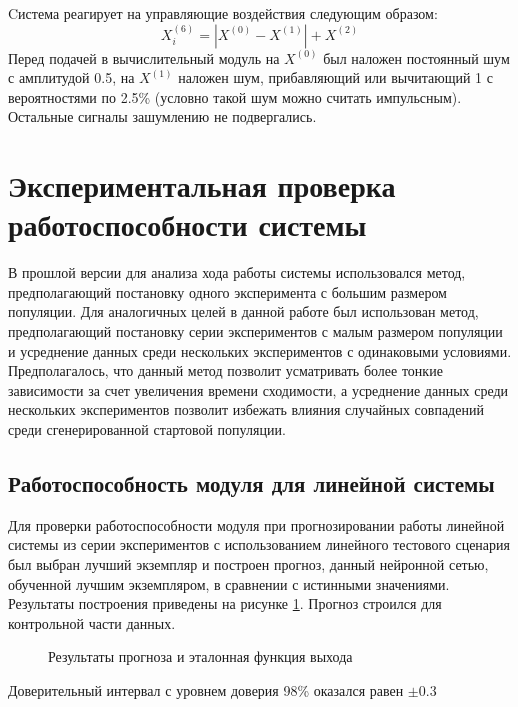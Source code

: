 \documentclass[utf8,usehyperref,14pt]{G7-32}
\begin{document}
Cистема реагирует на управляющие воздействия следующим образом:\\
\begin{equation}
X^{(6)}_{i} = |X^{(0)} - X^{(1)}| + X^{(2)}
\end{equation}
Перед подачей в вычислительный модуль на $ X^{(0)} $ был наложен постоянный шум с амплитудой 0.5, на $ X^{(1)} $ наложен шум, прибавляющий или вычитающий 1 с вероятностями по 2.5\% (условно такой шум можно считать импульсным). Остальные сигналы зашумлению не подвергались.

\section{Экспериментальная проверка работоспособности системы}
В прошлой версии для анализа хода работы системы использовался метод, предполагающий постановку одного эксперимента с большим размером популяции. Для аналогичных целей в данной работе был использован метод, предполагающий постановку серии экспериментов с малым размером популяции и усреднение данных среди нескольких экспериментов с одинаковыми условиями. Предполагалось, что данный метод позволит усматривать более тонкие зависимости за счет увеличения времени сходимости, а усреднение данных среди нескольких экспериментов позволит избежать влияния случайных совпадений среди сгенерированной стартовой популяции. \cite{SelfSystems}
\subsection{Работоспособность модуля для линейной системы}
Для проверки работоспособности модуля при прогнозировании работы линейной системы из серии экспериментов с использованием линейного тестового сценария был выбран лучший экземпляр и построен прогноз, данный нейронной сетью, обученной лучшим экземпляром, в сравнении с истинными значениями. Результаты построения приведены на рисунке \ref{linear_work}. Прогноз строился для контрольной части данных.
\begin{figure}[H]
 
  \caption{Результаты прогноза и эталонная функция выхода}\label{linear_work}
\end{figure}
Доверительный интервал с уровнем доверия 98\% оказался равен $ \pm 0.3 $
\end{document}
